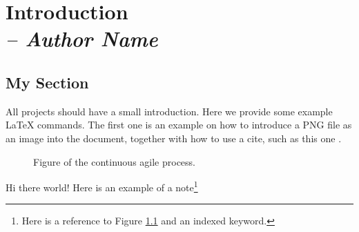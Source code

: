 \chapter{Introduction \\
\small{\textit{-- Author Name}} 
\label{Chapter::Introduction}}

\section{My Section \label{Section::MySection}}

All projects should have a small introduction.  Here we provide some
example LaTeX commands.  The first one is an example on how to
introduce a PNG file as an image into the document, together with 
how to use a cite, such as this one \cite{GM1998}.

\begin{figure}
\centering
{}
\caption{\label{Figure::manAgile} Figure of the continuous agile process.}
\end{figure}

\newpage

Hi there world!  Here is an example of a note\footnote{Here is a reference 
to Figure \ref{Figure::manAgile} and an indexed keyword.}
